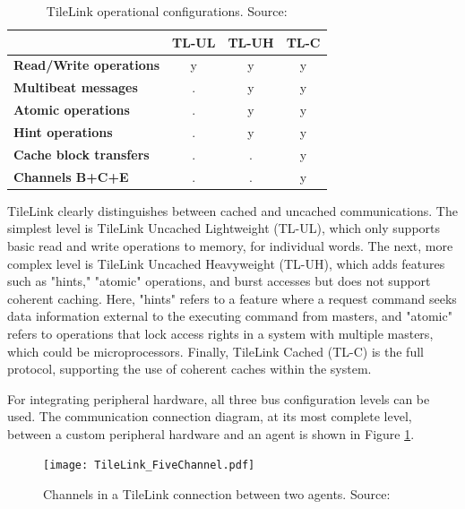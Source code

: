 \begin{table}[h!]
\centering
\caption{TileLink operational configurations. Source: \cite{sifive2018tilelink}}
\label{tab:tilelink_configs}
\begin{tabular}{|l|c|c|c|}
\hline
 & \textbf{TL-UL} & \textbf{TL-UH} & \textbf{TL-C} \\
\hline
\textbf{Read/Write operations} & y & y & y \\
\textbf{Multibeat messages} & . & y & y \\
\textbf{Atomic operations} & . & y & y \\
\textbf{Hint operations} & . & y & y \\
\textbf{Cache block transfers} & . & . & y \\
\textbf{Channels B+C+E} & . & . & y \\
\hline
\end{tabular}
\end{table}

TileLink clearly distinguishes between cached and uncached communications. The simplest level is TileLink Uncached Lightweight (TL-UL), which only supports basic read and write operations to memory, for individual words. The next, more complex level is TileLink Uncached Heavyweight (TL-UH), which adds features such as "hints," "atomic" operations, and burst accesses but does not support coherent caching. Here, "hints" refers to a feature where a request command seeks data information external to the executing command from masters, and "atomic" refers to operations that lock access rights in a system with multiple masters, which could be microprocessors. Finally, TileLink Cached (TL-C) is the full protocol, supporting the use of coherent caches within the system.

For integrating peripheral hardware, all three bus configuration levels can be used. The communication connection diagram, at its most complete level, between a custom peripheral hardware and an agent is shown in Figure \ref{fig:tilelink_channels}.

\begin{figure}[h!]
    \centering
    \texttt{[image: TileLink\_FiveChannel.pdf]}
    \caption{Channels in a TileLink connection between two agents. Source: \cite{sifive2018tilelink}}
    \label{fig:tilelink_channels}
\end{figure}

